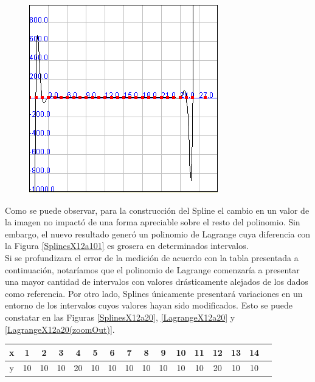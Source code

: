 \documentclass[a4paper]{article}
\begin{document}
\begin{figure}
	\caption{}
	\begin{center}
	\includegraphics[scale=1]{imagenes/LagrangeX12a101(zoomOut)}
	\label{LagrangeX12a101(zoomOut)}
  \end{center}
\end{figure}

Como se puede observar, para la construcción del Spline el cambio en un valor de la imagen no impactó de una forma apreciable sobre el resto del polinomio. Sin embargo, el nuevo resultado generó un polinomio de Lagrange cuya diferencia con la Figura \ref{SplinesX12a101} es grosera en determinados intervalos.\\ 

Si se profundizara el error de la medición de acuerdo con la tabla presentada a continuación, notaríamos que el polinomio de Lagrange comenzaría a presentar una mayor cantidad de intervalos con valores drásticamente alejados de los dados como referencia. Por otro lado, Splines únicamente presentará variaciones en un entorno de los intervalos cuyos valores hayan sido modificados. Esto se puede  constatar en las Figuras \ref{SplinesX12a20}, \ref{LagrangeX12a20} y  \ref{LagrangeX12a20(zoomOut)}.\\


\begin{tabular}{ | c || c | c | c | c | c |c | c | c | c | c | c | c | c | c | c |}
 \hline                 
   x & 1 & 2 & 3 & 4 & 5 & 6 & 7 & 8 & 9 & 10 & 11 & 12 & 13 & 14 \\
 \hline    
y & 10 & 10& 10& 20& 10& 10& 10& 10& 10& 10& 10& 20& 10 & 10\\
 \hline  
 \end{tabular}
\end{document}
